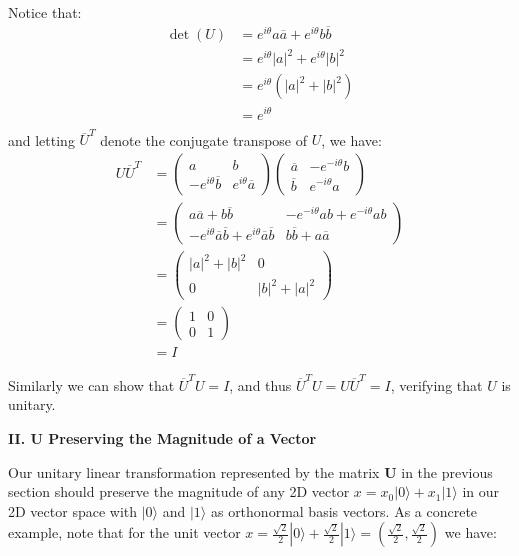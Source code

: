 \documentclass{article}
\begin{document}
Notice that:
\begin{align*}
\det(U)      &= e^{i\theta}a \overline{a} + e^{i\theta}b \overline{b}\\
&= e^{i\theta}|a|^2 + e^{i\theta}|b|^2\\
&= e^{i\theta}(|a|^2 + |b|^2)\\
&= e^{i\theta}\\
\end{align*}
and letting $\overline{U}^{T}$ denote the conjugate transpose of $U$, we have:
\begin{align*}
U \overline{U}^{T} &=
\begin{pmatrix}
a & b\\
-e^{i\theta}\overline{b} & e^{i\theta}\overline{a}
\end{pmatrix}
\begin{pmatrix}
\overline{a} & -e^{-i\theta}b\\
\overline{b} & e^{-i\theta}a
\end{pmatrix}\\
&= \begin{pmatrix}
   a\overline{a} + b\overline{b} &
   -e^{-i\theta}ab + e^{-i\theta}ab\\
   -e^{i\theta}\overline{a}\overline{b} + e^{i\theta}\overline{a}\overline{b} &
   b\overline{b} + a\overline{a}
   \end{pmatrix}\\
&= \begin{pmatrix}
   |a|^2 + |b|^2 & 0\\
   0             & |b|^2 + |a|^2
   \end{pmatrix}\\
&= \begin{pmatrix}
   1 & 0\\
   0 & 1
   \end{pmatrix}\\
&= I
\end{align*}

Similarly we can show that $\overline{U}^{T}U = I$, and thus $\overline{U}^{T}U = U\overline{U}^{T} = I$, verifying that $U$ is unitary.

\vspace{0.25in}

\textbf{II. U Preserving the Magnitude of a Vector}\par

\vspace{0.125in}

Our unitary linear transformation represented by the matrix \textbf{U} in the previous section should preserve the magnitude of any 2D vector $x = x_0 |0\rangle + x_1 |1\rangle$ in our 2D vector space with $|0\rangle$ and $|1\rangle$ as orthonormal basis vectors. As a concrete example, note that for the unit vector $x = \frac{\sqrt{2}}{2} |0\rangle + \frac{\sqrt{2}}{2} |1\rangle = (\frac{\sqrt{2}}{2}, \frac{\sqrt{2}}{2})$ we have:
\end{document}
